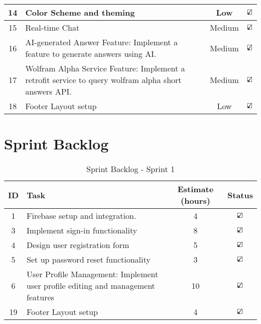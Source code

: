 \begin{longtable}{|c|p{7cm}|c|c|}
    \hline
    14 & Color Scheme and theming & Low & $\text{\rlap{$\checkmark$}}\square$\\
    \hline
    15 & Real-time Chat & Medium & $\text{\rlap{$\checkmark$}}\square$\\
    \hline
    16 & AI-generated Answer Feature: Implement a feature to generate answers using AI. & Medium & $\text{\rlap{$\checkmark$}}\square$\\
    \hline
    17 & Wolfram Alpha Service Feature: Implement a retrofit service to query wolfram alpha short answers API. & Medium & $\text{\rlap{$\checkmark$}}\square$\\
    \hline
    18 & Footer Layout setup & Low & $\text{\rlap{$\checkmark$}}\square$\\
    \hline
\end{longtable}



\section{Sprint Backlog}\label{sprint_backlog}

\begin{table}[H]
    \centering
    \caption*{Sprint Backlog - Sprint 1}
    \begin{tabular}{|c|p{5cm}|c|c|}
        \hline
        \textbf{ID} & \textbf{Task} & \textbf{Estimate (hours)} & \textbf{Status} \\
        \hline
        1 & Firebase setup and integration. & 4 & $\text{\rlap{$\checkmark$}}\square$\\
        \hline
        3 & Implement sign-in functionality & 8 & $\text{\rlap{$\checkmark$}}\square$\\
        \hline
        4 & Design user registration form & 5 & $\text{\rlap{$\checkmark$}}\square$\\
        \hline
        5 & Set up password reset functionality & 3 & $\text{\rlap{$\checkmark$}}\square$\\
        \hline
        6 & User Profile Management: Implement user profile editing and management features & 10 & $\text{\rlap{$\checkmark$}}\square$\\
        \hline
        19 & Footer Layout setup & 4 & $\text{\rlap{$\checkmark$}}\square$\\
        \hline
    \end{tabular}
\end{table}


